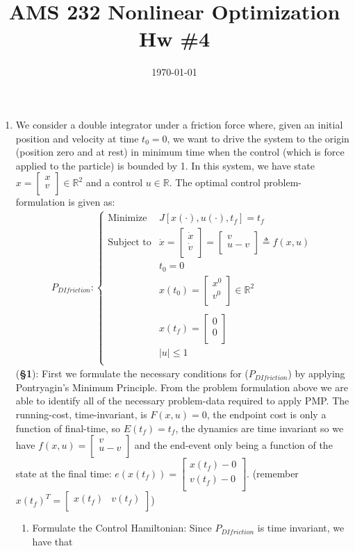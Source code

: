 \documentclass[10pt]{article}
\newcommand{\mat}[2][ccccccccccccccc]{\left [\!\!\begin{array}{#1} #2\\ \end{array} \!\!\right]}
\newcommand{\piece}[2][cll]{\left \{\begin{array}{#1} #2\\ \end{array} \right. }
\newcommand{\abs}[1]{ \left|#1\right|}
\newcommand{\bbr}{\mathbb{R}}
\begin{document}
    \title{AMS 232 Nonlinear Optimization Hw \#4}
    \author{}
    \date{\today}
    \maketitle

\begin{enumerate}[leftmargin=*]
\item We consider a double integrator under a friction force where, given an initial position and velocity at time $t_0=0$, we want to drive the system to the origin (position zero and at rest) in minimum time when the control (which is force applied to the particle) is bounded by 1.  In this system, we have state $x= \mat{x\\v}\in\bbr^2$ and a control $u\in\bbr$. The optimal control problem-formulation is given as:
        \begin{align*}
            P_{DIfriction} : \piece{ \text{Minimize} & J[x(\cdot), u(\cdot), t_f] = t_f \\
                    \text{Subject to} & \dot x = \mat{\dot x \\ \dot v} = \mat{v \\ u-v }\triangleq f(x,u) \\
                     & t_0 = 0 \\
                     & x(t_0)=\mat{x^0\\v^0}\in\bbr^2 \\\\
                     & x(t_f)=\mat{0\\0} \\
                     & \abs{u}\le 1
                 }
        \end{align*}
      (\textbf{\S1}): First we formulate the necessary conditions for ($P_{DIfriction}$) by applying Pontryagin's Minimum Principle.  From the problem formulation above we are able to identify all of the necessary problem-data required to apply PMP.  The running-cost, time-invariant, is $F(x,u)=0$, the endpoint cost is only a function of final-time, so $E(t_f)=t_f$, the dynamics are time invariant so we have $f(x,u)=\mat{v \\ u-v }$ and the end-event only being a function of the state at the final time: $e(x(t_f))=\mat{x(t_f)-0\\v(t_f)-0}$. (remember $x(t_f)^T=\mat{x(t_f) & v(t_f)}$)
      \begin{enumerate}[label=\roman*]
        \item Formulate the Control Hamiltonian:  Since $P_{DIfriction}$ is time invariant, we have that

\end{enumerate}
\end{enumerate}
\end{document}
